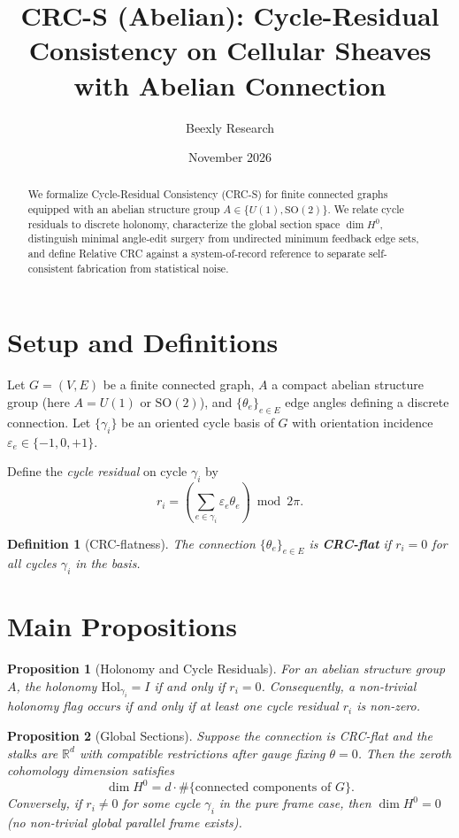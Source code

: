 \documentclass[11pt]{article}
\title{\textbf{CRC-S (Abelian): Cycle-Residual Consistency on Cellular Sheaves with Abelian Connection}}
\author{Beexly Research}
\date{November 2026}
\newtheorem{definition}{Definition}
\newtheorem{proposition}{Proposition}
\begin{document}
\maketitle

\begin{abstract}
We formalize Cycle-Residual Consistency (CRC-S) for finite connected graphs equipped with an abelian structure group $A \in \{U(1), \mathrm{SO}(2)\}$. We relate cycle residuals to discrete holonomy, characterize the global section space $\dim H^0$, distinguish minimal angle-edit surgery from undirected minimum feedback edge sets, and define Relative CRC against a system-of-record reference to separate self-consistent fabrication from statistical noise.
\end{abstract}

\section{Setup and Definitions}
Let $G = (V, E)$ be a finite connected graph, $A$ a compact abelian structure group (here $A = U(1)$ or $\mathrm{SO}(2)$), and $\{\theta_e\}_{e \in E}$ edge angles defining a discrete connection. Let $\{\gamma_i\}$ be an oriented cycle basis of $G$ with orientation incidence $\varepsilon_e \in \{-1, 0, +1\}$.

Define the \emph{cycle residual} on cycle $\gamma_i$ by
\begin{equation}
  r_i = \left( \sum_{e \in \gamma_i} \varepsilon_e \theta_e \right) \bmod 2\pi.
\end{equation}

\begin{definition}[CRC-flatness]
The connection $\{\theta_e\}_{e \in E}$ is \textbf{CRC-flat} if $r_i = 0$ for all cycles $\gamma_i$ in the basis.
\end{definition}

\section{Main Propositions}

\begin{proposition}[Holonomy and Cycle Residuals]
For an abelian structure group $A$, the holonomy $\mathrm{Hol}_{\gamma_i} = I$ if and only if $r_i = 0$. Consequently, a non-trivial holonomy flag occurs if and only if at least one cycle residual $r_i$ is non-zero.
\end{proposition}

\begin{proposition}[Global Sections]
Suppose the connection is CRC-flat and the stalks are $\mathbb{R}^d$ with compatible restrictions after gauge fixing $\theta = 0$. Then the zeroth cohomology dimension satisfies
\begin{equation}
  \dim H^0 = d \cdot \#\{\text{connected components of } G\}.
\end{equation}
Conversely, if $r_i \neq 0$ for some cycle $\gamma_i$ in the pure frame case, then $\dim H^0 = 0$ (no non-trivial global parallel frame exists).
\end{proposition}
\end{document}
